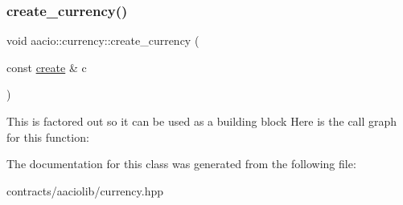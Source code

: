 \subsubsection{\texorpdfstring{create\+\_\+currency()}{create\_currency()}}
{\footnotesize\ttfamily void aacio\+::currency\+::create\+\_\+currency (\begin{DoxyParamCaption}\item[{const \mbox{\hyperlink{structaacio_1_1currency_1_1create}{create}} \&}]{c }\end{DoxyParamCaption})\hspace{0.3cm}{\ttfamily [inline]}}

This is factored out so it can be used as a building block Here is the call graph for this function\+:


The documentation for this class was generated from the following file\+:\begin{DoxyCompactItemize}
\item 
contracts/aaciolib/currency.\+hpp\end{DoxyCompactItemize}
